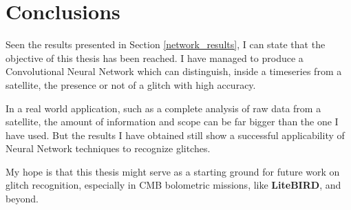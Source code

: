 \documentclass[12pt,a4paper,final]{book}			%
\begin{document}
			
		\chapter{Conclusions}\label{Conclusions}
		
			Seen the results presented in Section \ref{network_results}, I can state that the objective of this thesis has been reached. I have managed to produce a Convolutional Neural Network which can distinguish, inside a timeseries from a satellite, the presence or not of a glitch with high accuracy. 
			
			In a real world application, such as a complete analysis of raw data from a satellite, the amount of information and scope can be far bigger than the one I have used. But the results I have obtained still show a successful applicability of Neural Network techniques to recognize glitches. 
			
			My hope is that this thesis might serve as a starting ground for future work on glitch recognition, especially in CMB bolometric missions, like \textbf{LiteBIRD}, and beyond.
		
%
%
{}

%
 
% 
\end{document}
